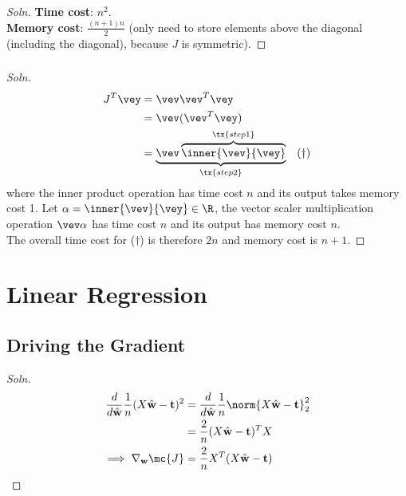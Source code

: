 \documentclass{article}
\begin{document}
	\subsubsection{}
	\begin{proof}[Soln]
		\textbf{Time cost}: $n^2$. \\
		\textbf{Memory cost}: $\frac{(n+1)n}{2}$ (only need to store elements above the diagonal (including the diagonal), because $J$ is symmetric).
	\end{proof}
	\subsubsection{}
	\begin{proof}[Soln]
		\begin{align}
			J^T \vey &= \vev \vev^T \vey \\
			&= \vev (\vev^T \vey) \\
			&= \underbrace{\vev \overbrace{\inner{\vev}{\vey}}^{\tx{step 1}}}_{\tx{step 2}}\quad (\dagger)
		\end{align}
		where the inner product operation has time cost $n$ and its output takes memory cost 1. Let $\alpha = \inner{\vev}{\vey} \in \R$, the vector scaler multiplication operation $\vev \alpha$ has time cost $n$ and its output has memory cost $n$. \\
		The overall time cost for ($\dagger$) is therefore $2n$ and memory cost is $n + 1$.
	\end{proof}

	\section{Linear Regression}
	\subsection{Driving the Gradient}
	\begin{proof}[Soln]
		\begin{align}
			\frac{d}{d\hat{\textbf{w}}} \frac{1}{n} (X \hat{\textbf{w}} - \textbf{t})^2
			&= \frac{d}{d\hat{\textbf{w}}} \frac{1}{n} \norm{X \hat{\textbf{w}} - \textbf{t}}^2_2 \\
			&= \frac{2}{n} (X \hat{\textbf{w}} - \textbf{t})^T X \\
		\implies \nabla_{\textbf{w}} \mc{J} &= \frac{2}{n} X^T(X\hat{\textbf{w}} - \textbf{t})
		\end{align}
	\end{proof}
\end{document}
